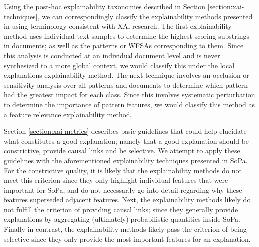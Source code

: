 Using the post-hoc explainability taxonomies described in Section \ref{section:xai-techniques}, we can correspondingly classify the explainability methods presented in \citet{schwartz2018sopa} using terminology consistent with XAI research. The first explainability method uses individual text samples to determine the highest scoring substrings in documents; as well as the patterns or WFSAs corresponding to them. Since this analysis is conducted at an individual document level and is never synthesized to a more global context, we would classify this under the local explanations explainability method. The next technique involves an occlusion or sensitivity analysis over all patterns and documents to determine which pattern had the greatest impact for each class. Since this involves systematic perturbation to determine the importance of pattern features, we would classify this method as a feature relevance explainability method.

Section \ref{section:xai-metrics} describes basic guidelines that could help elucidate what constitutes a good explanation; namely that a good explanation should be constrictive, provide causal links and be selective. We attempt to apply these guidelines with the aforementioned explainability techniques presented in SoPa. For the constrictive quality, it is likely that the explainability methods do not meet this criterion since they only highlight individual features that were important for SoPa, and do not necessarily go into detail regarding why these features superseded adjacent features. Next, the explainability methods likely do not fulfill the criterion of providing causal links; since they generally provide explanations by aggregating (ultimately) probabilistic quantities inside SoPa. Finally in contrast, the explainability methods likely pass the criterion of being selective since they only provide the most important features for an explanation. 


